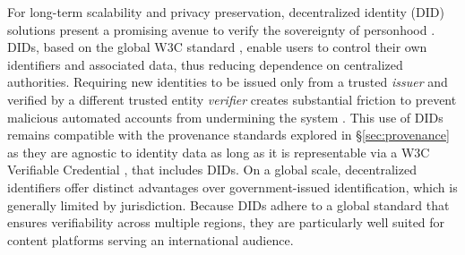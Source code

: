 \documentclass{article}
\begin{document}
For long-term scalability and privacy preservation, decentralized identity (DID) solutions present a promising avenue to verify the sovereignty of personhood \cite{did}. DIDs, based on the global W3C standard \cite{w3c:did-2022}, enable users to control their own identifiers and associated data, thus reducing dependence on centralized authorities. Requiring new identities to be issued only from a trusted \textit{issuer} and verified by a different trusted entity \textit{verifier} creates substantial friction to prevent malicious automated accounts from undermining the system \cite{microsoft-did}. This use of DIDs remains compatible with the provenance standards \cite{c2pa} explored in \S\ref{sec:provenance} as they are agnostic to identity data as long as it is representable via a W3C Verifiable Credential \cite{w3c:creds-2019}, that includes DIDs. On a global scale, decentralized identifiers offer distinct advantages over government-issued identification, which is generally limited by jurisdiction. Because DIDs adhere to a global standard that ensures verifiability across multiple regions, they are particularly well suited for content platforms serving an international audience.



\end{document}
